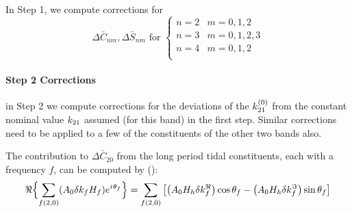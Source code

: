 In Step 1, we compute corrections for 
\begin{equation}
  \Delta \bar{C}_{nm}, \Delta \bar{S}_{nm} \text{ for }
    \begin{cases}
      n=2 & m=0,1,2 \\
      n=3 & m=0,1,2,3 \\
      n=4 & m=0,1,2\\
    \end{cases}
\end{equation} 

\paragraph{Step 2 Corrections}\label{par:step2-corr-earth-tides}
in Step 2 we compute corrections for the deviations of the 
$k ^{(0)}_{21}$ from the constant nominal value $k _{21}$ 
assumed (for this band) in the first step. Similar corrections need to be 
applied to a few of the constituents of the other two bands also.

The contribution to $\Delta \bar{C}_{20}$ from the long period tidal 
constituents, each with a frequency $f$, can be computed by (\cite{iers2010}):
\begin{equation}
  \Re \Bigl\{ \sum _{f(2,0)}(A_0 \delta k_f H_f) e^{{i\mkern1mu} \theta _f} \Bigr\} = 
    \sum_{f(2,0)} \left[ \left(A_0 H_h \delta k^\Re _f \right) \cos \theta _f 
      - \left(A_0 H_h \delta k^\Im _f \right) \sin \theta _f 
    \right]
  \label{eq:iers1068a}
\end{equation}

